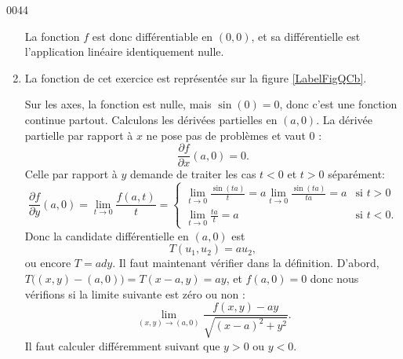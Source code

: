 \begin{corrige}{0044}
\begin{enumerate}
La fonction $f$ est donc différentiable en $(0,0)$, et sa différentielle est l'application linéaire identiquement nulle.

\item 
La fonction de cet exercice est représentée sur la figure \ref{LabelFigQCb}.
\newcommand{\CaptionFigQCb}{La fonction de l'exercice \ref{exo0044}\ref{Item0044b}. En rouge, les zones où la fonction n'est pas trivialement différentiable.}


Sur les axes, la fonction est nulle, mais $\sin(0)=0$, donc c'est une fonction continue partout. Calculons les dérivées partielles en $(a,0)$. La dérivée partielle par rapport à $x$ ne pose pas de problèmes et vaut $0$ :
\begin{equation}
	\frac{ \partial f }{ \partial x }(a,0)=0.
\end{equation}
Celle par rapport à $y$ demande de traiter les cas $t<0$ et $t>0$ séparément:
\begin{equation}
	\frac{ \partial f }{ \partial y }(a,0)=\lim_{t\to 0}\frac{ f(a,t) }{ t }=
\begin{cases}
	\lim_{t\to 0}\frac{ \sin(ta) }{ t }=a\lim_{t\to 0}\frac{ \sin(ta) }{ ta }=a	&	\text{si }t>0\\
	\lim_{t\to 0}\frac{ ta }{ t }=a	&	 \text{si }t<0.
\end{cases}
\end{equation}
Donc la candidate différentielle en $(a,0)$ est 
\begin{equation}
	T(u_1,u_2)=au_2,
\end{equation}
ou encore $T=ady$. Il faut maintenant vérifier dans la définition. D'abord, $T\big( (x,y)-(a,0) \big)=T(x-a,y)=ay$, et $f(a,0)=0$ donc nous vérifions si la limite suivante est zéro ou non :
\begin{equation}		\label{Eqd0044}
	\lim_{(x,y)\to (a,0)}\frac{ f(x,y)-ay }{ \sqrt{(x-a)^2+y^2} }.
\end{equation}
Il faut calculer différemment suivant que $y>0$ ou $y<0$. 


\end{enumerate}
\end{corrige}
